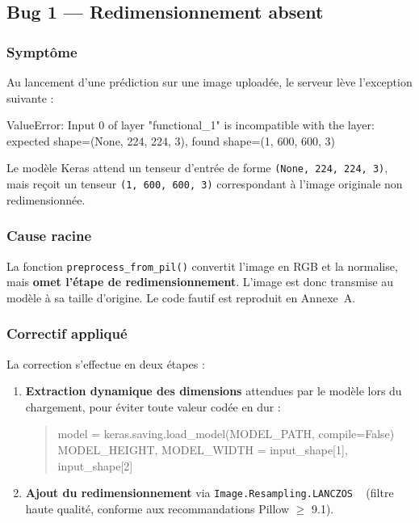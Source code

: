 \documentclass[french, a4paper, 12pt]{article}
\begin{document}
\subsection{Bug 1 --- Redimensionnement absent}

\subsubsection*{Symptôme}

Au lancement d'une prédiction sur une image uploadée, le serveur lève
l'exception suivante :

\begin{mdframed}[linecolor=red!60, linewidth=1pt, backgroundcolor=red!4,
                 innertopmargin=6pt, innerbottommargin=6pt]
\small\ttfamily
ValueError: Input 0 of layer "functional\_1" is incompatible with the layer:\\
expected shape=(None, 224, 224, 3), found shape=(1, 600, 600, 3)
\end{mdframed}

Le modèle Keras attend un tenseur d'entrée de forme \texttt{(None, 224, 224, 3)},
mais reçoit un tenseur \texttt{(1, 600, 600, 3)} correspondant à l'image originale
non redimensionnée.

\subsubsection*{Cause racine}

La fonction \texttt{preprocess\_from\_pil()} convertit l'image en RGB et la
normalise, mais \textbf{omet l'étape de redimensionnement}. L'image est donc
transmise au modèle à sa taille d'origine. Le code fautif est reproduit en
Annexe~A.

\subsubsection*{Correctif appliqué}

La correction s'effectue en deux étapes :

\begin{enumerate}[leftmargin=1.5cm]
    \item \textbf{Extraction dynamique des dimensions} attendues par le modèle
          lors du chargement, pour éviter toute valeur codée en dur :
          \begin{quote}\small\ttfamily
          model = keras.saving.load\_model(MODEL\_PATH, compile=False)\\
          MODEL\_HEIGHT, MODEL\_WIDTH = input\_shape[1], input\_shape[2]
          \end{quote}

    \item \textbf{Ajout du redimensionnement} via \texttt{Image.Resampling.LANCZOS}%
          ~\cite{Pillow} (filtre haute qualité, conforme aux recommandations
          Pillow $\geq$ 9.1).
\end{enumerate}
\end{document}
